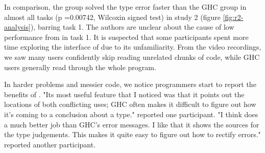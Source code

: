   




In comparison, the \chameleon{} group solved the type error faster than the GHC group in almost all tasks (p =0.00742, Wilcoxin signed test) in study 2 (figure \ref{fig:r2-analysis}), barring task 1. The authors are unclear about the cause of low performance from \chameleon{} in task 1. It is suspected that some participants spent more time exploring the interface of \chameleon{} due to its unfamiliarity. From the video recordings, we saw many \chameleon{} users confidently skip reading unrelated chunks of code, while GHC users generally read through the whole program.


In harder problems and messier code, we notice programmers start to report the benefits of \chameleon{}. "Its most useful feature that I noticed was that it points out the locations of both conflicting uses; GHC often makes it difficult to figure out how it's coming to a conclusion about a type." reported one participant. "I think \chameleon{}  does a much better job than GHC's error messages. I like that it shows the sources for the type judgements. This makes it quite easy to figure out how to rectify errors." reported another participant.



